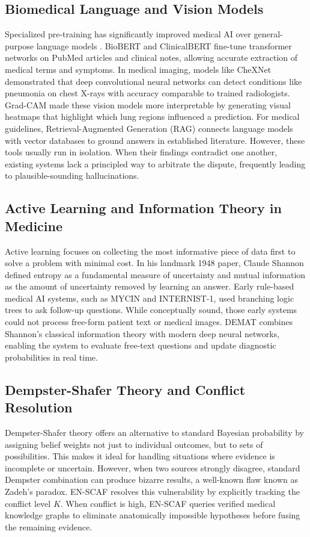 \documentclass[10pt,twocolumn]{article}
\begin{document}
\subsection{Biomedical Language and Vision Models}
Specialized pre-training has significantly improved medical AI over general-purpose language models \cite{devlin2019bert}. BioBERT \cite{lee2020biobert} and ClinicalBERT fine-tune transformer networks on PubMed articles and clinical notes, allowing accurate extraction of medical terms and symptoms. In medical imaging, models like CheXNet \cite{rajpurkar2017chexnet} demonstrated that deep convolutional neural networks \cite{he2016deep} can detect conditions like pneumonia on chest X-rays with accuracy comparable to trained radiologists. Grad-CAM \cite{selvaraju2017grad} made these vision models more interpretable by generating visual heatmaps that highlight which lung regions influenced a prediction. For medical guidelines, Retrieval-Augmented Generation (RAG) \cite{lewis2020retrieval} connects language models with vector databases \cite{johnson2019billion} to ground answers in established literature. However, these tools usually run in isolation. When their findings contradict one another, existing systems lack a principled way to arbitrate the dispute, frequently leading to plausible-sounding hallucinations.

\subsection{Active Learning and Information Theory in Medicine}
Active learning focuses on collecting the most informative piece of data first to solve a problem with minimal cost. In his landmark 1948 paper, Claude Shannon \cite{shannon1948mathematical} defined entropy as a fundamental measure of uncertainty and mutual information as the amount of uncertainty removed by learning an answer. Early rule-based medical AI systems, such as MYCIN and INTERNIST-1, used branching logic trees to ask follow-up questions. While conceptually sound, those early systems could not process free-form patient text or medical images. DEMAT combines Shannon's classical information theory with modern deep neural networks, enabling the system to evaluate free-text questions and update diagnostic probabilities in real time.

\subsection{Dempster-Shafer Theory and Conflict Resolution}
Dempster-Shafer theory \cite{dempster1967upper, shafer1976mathematical} offers an alternative to standard Bayesian probability by assigning belief weights not just to individual outcomes, but to sets of possibilities. This makes it ideal for handling situations where evidence is incomplete or uncertain. However, when two sources strongly disagree, standard Dempster combination can produce bizarre results, a well-known flaw known as Zadeh's paradox. EN-SCAF resolves this vulnerability by explicitly tracking the conflict level $K$. When conflict is high, EN-SCAF queries verified medical knowledge graphs to eliminate anatomically impossible hypotheses before fusing the remaining evidence.
\end{document}
